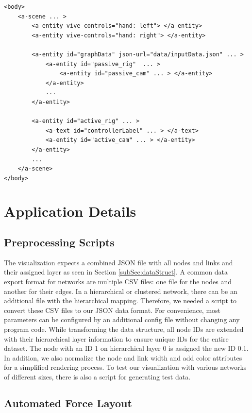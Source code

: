 \begin{lstlisting}[label={lst:virtualSceneGraph},caption=Simplified virtual A-Frame scene graph used by the application.]
<body>
    <a-scene ... >
        <a-entity vive-controls="hand: left"> </a-entity>
        <a-entity vive-controls="hand: right"> </a-entity>
        
        <a-entity id="graphData" json-url="data/inputData.json" ... >
            <a-entity id="passive_rig"  ... >  
                <a-entity id="passive_cam" ... > </a-entity>
            </a-entity>
            ...
        </a-entity>

        <a-entity id="active_rig" ... >
            <a-text id="controllerLabel" ... > </a-text>
            <a-entity id="active_cam" ... > </a-entity>
        </a-entity>
        ...
    </a-scene>
</body>
\end{lstlisting}

\section{Application Details}
\label{sec:applDetails}
\subsection{Preprocessing Scripts}
\label{sec:preprocessing}

The visualization expects a combined JSON file with all nodes and links and their assigned layer as seen in Section \ref{subSec:dataStruct}.
A common data export format for networks are multiple CSV files: one file for the nodes and another for their edges.
In a hierarchical or clustered network, there can be an additional file with the hierarchical mapping.
Therefore, we needed a script to convert these CSV files to our JSON data format. For convenience, most parameters can be configured by an additional config file without changing any program code. 
While transforming the data structure, all node IDs are extended with their hierarchical layer information to ensure unique IDs for the entire dataset. The node with an ID 1 on hierarchical layer 0 is assigned the new ID 0.1.  
In addition, we also normalize the node and link width and add color attributes for a simplified rendering process.
To test our visualization with various networks of different sizes, there is also a script for generating test data.

\subsection{Automated Force Layout}
\label{sec:layoutCalculation}

